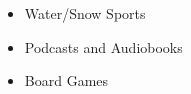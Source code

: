 %
%
%

\twocolumnsection
{
\begin{skills}
\end{skills}}
{
\vspace{1em}
\begin{itemize}
	\item Water/Snow Sports                    
    \item Podcasts and Audiobooks
    \item Board Games
\end{itemize}
}
